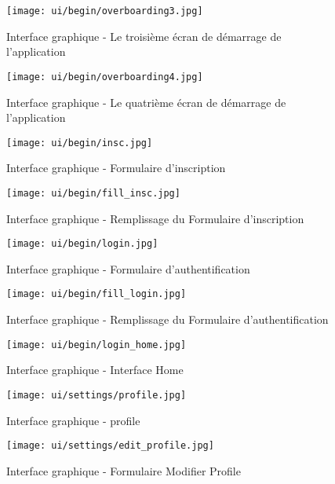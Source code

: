 \begin{figure}[H]
    \centering
    \texttt{[image: ui/begin/overboarding3.jpg]}
    \caption{Interface graphique - Le troisième écran de démarrage de l'application}
\end{figure}

\begin{figure}[H]
    \centering
    \texttt{[image: ui/begin/overboarding4.jpg]}
    \caption{Interface graphique - Le quatrième écran de démarrage de l'application}
\end{figure}

\begin{figure}[H]
    \centering
    \texttt{[image: ui/begin/insc.jpg]}
    \caption{Interface graphique - Formulaire d'inscription}
\end{figure}

\begin{figure}[H]
    \centering
     \texttt{[image: ui/begin/fill\_insc.jpg]}
    \caption{Interface graphique - Remplissage du Formulaire d'inscription}
\end{figure}

\begin{figure}[H]
    \centering
    \texttt{[image: ui/begin/login.jpg]}
    \caption{Interface graphique - Formulaire d'authentification}
\end{figure}

\begin{figure}[H]
    \centering
     \texttt{[image: ui/begin/fill\_login.jpg]}
    \caption{Interface graphique - Remplissage du Formulaire d'authentification}
\end{figure}
\newpage
\begin{figure}[H]
    \centering
    \texttt{[image: ui/begin/login\_home.jpg]}
    \caption{Interface graphique - Interface Home}
\end{figure}

 
\begin{figure}[H]
    \centering
    \texttt{[image: ui/settings/profile.jpg]}
    \caption{Interface graphique -  profile}
\end{figure}

\begin{figure}[H]
    \centering
    \texttt{[image: ui/settings/edit\_profile.jpg]}
    \caption{Interface graphique - Formulaire Modifier Profile}
\end{figure}

